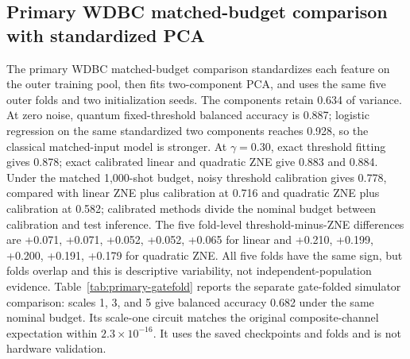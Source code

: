\documentclass[conference]{IEEEtran}
\begin{document}
\subsection{Primary WDBC matched-budget comparison with standardized PCA}
The primary WDBC matched-budget comparison standardizes each feature on the outer training pool, then fits two-component PCA, and uses the same five outer folds and two initialization seeds. The components retain 0.634 of variance. At zero noise, quantum fixed-threshold balanced accuracy is 0.887; logistic regression on the same standardized two components reaches 0.928, so the classical matched-input model is stronger. At $\gamma=0.30$, exact threshold fitting gives 0.878; exact calibrated linear and quadratic ZNE give 0.883 and 0.884. Under the matched 1,000-shot budget, noisy threshold calibration gives 0.778, compared with linear ZNE plus calibration at 0.716 and quadratic ZNE plus calibration at 0.582; calibrated methods divide the nominal budget between calibration and test inference. The five fold-level threshold-minus-ZNE differences are +0.071, +0.071, +0.052, +0.052, +0.065 for linear and +0.210, +0.199, +0.200, +0.191, +0.179 for quadratic ZNE. All five folds have the same sign, but folds overlap and this is descriptive variability, not independent-population evidence.
Table~\ref{tab:primary-gatefold} reports the separate gate-folded simulator comparison: scales 1, 3, and 5 give balanced accuracy 0.682 under the same nominal budget. Its scale-one circuit matches the original composite-channel expectation within $2.3\times10^{-16}$. It uses the saved checkpoints and folds and is not hardware validation.
\end{document}
